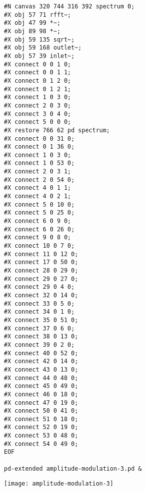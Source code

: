 \begin{itemize}
\begin{verbatim}
#N canvas 320 744 316 392 spectrum 0;
#X obj 57 71 rfft~;
#X obj 47 99 *~;
#X obj 89 98 *~;
#X obj 59 135 sqrt~;
#X obj 59 168 outlet~;
#X obj 57 39 inlet~;
#X connect 0 0 1 0;
#X connect 0 0 1 1;
#X connect 0 1 2 0;
#X connect 0 1 2 1;
#X connect 1 0 3 0;
#X connect 2 0 3 0;
#X connect 3 0 4 0;
#X connect 5 0 0 0;
#X restore 766 62 pd spectrum;
#X connect 0 0 31 0;
#X connect 0 1 36 0;
#X connect 1 0 3 0;
#X connect 1 0 53 0;
#X connect 2 0 3 1;
#X connect 2 0 54 0;
#X connect 4 0 1 1;
#X connect 4 0 2 1;
#X connect 5 0 10 0;
#X connect 5 0 25 0;
#X connect 6 0 9 0;
#X connect 6 0 26 0;
#X connect 9 0 8 0;
#X connect 10 0 7 0;
#X connect 11 0 12 0;
#X connect 17 0 50 0;
#X connect 28 0 29 0;
#X connect 29 0 27 0;
#X connect 29 0 4 0;
#X connect 32 0 14 0;
#X connect 33 0 5 0;
#X connect 34 0 1 0;
#X connect 35 0 51 0;
#X connect 37 0 6 0;
#X connect 38 0 13 0;
#X connect 39 0 2 0;
#X connect 40 0 52 0;
#X connect 42 0 14 0;
#X connect 43 0 13 0;
#X connect 44 0 48 0;
#X connect 45 0 49 0;
#X connect 46 0 18 0;
#X connect 47 0 19 0;
#X connect 50 0 41 0;
#X connect 51 0 18 0;
#X connect 52 0 19 0;
#X connect 53 0 48 0;
#X connect 54 0 49 0;
EOF

pd-extended amplitude-modulation-3.pd &
\end{verbatim}

\begin{center}
  \texttt{[image: amplitude-modulation-3]}
\end{center}

\end{itemize}


